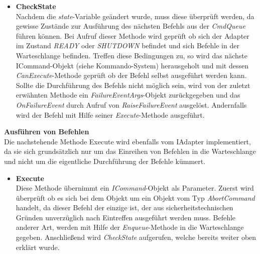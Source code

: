\begin{itemize}
\item \textbf{CheckState}\\
Nachdem die \textit{state}-Variable geändert wurde, muss diese überprüft werden, da gewisse Zustände zur Ausführung des nächsten Befehls aus der \textit{CmdQueue} führen können. Bei Aufruf dieser Methode wird geprüft ob sich der Adapter im Zustand \textit{READY} oder \textit{SHUTDOWN} befindet und sich Befehle in der Warteschlange befinden. Treffen diese Bedingungen zu, so wird das nächste ICommand-Objekt (siehe Kommando-System) herausgeholt und mit dessen \textit{CanExecute}-Methode geprüft ob der Befehl selbst ausgeführt werden kann. \\
Sollte die Durchführung des Befehls nicht möglich sein, wird von der zuletzt erwähnten Methode ein \textit{FailureEventArgs}-Objekt zurückgegeben und das \textit{OnFailureEvent} durch Aufruf von \textit{RaiseFailureEvent} ausgelöst. Andernfalls wird der Befehl mit Hilfe seiner \textit{Execute}-Methode ausgeführt.
\end{itemize}

\textbf{Ausführen von Befehlen}\\
Die nachstehende Methode {Execute} wird ebenfalls vom IAdapter implementiert, da sie sich grundsätzlich nur um das Einreihen von Befehlen in die Warteschlange und nicht um die eigentliche Durchführung der Befehle kümmert.
\begin{itemize}
\item \textbf{Execute}\\
Diese Methode übernimmt ein \textit{ICommand}-Objekt als Parameter. Zuerst wird überprüft ob es sich bei dem Objekt um ein Objekt vom Typ \textit{AbortCommand} handelt, da dieser Befehl der einzige ist, der aus sicherheitstechnischen Gründen unverzüglich nach Eintreffen ausgeführt werden muss. Befehle anderer Art, werden mit Hilfe der \textit{Enqueue}-Methode in die Warteschlange gegeben. Anschließend wird \textit{CheckState} aufgerufen, welche bereits weiter oben erklärt wurde.\\
\end{itemize}

